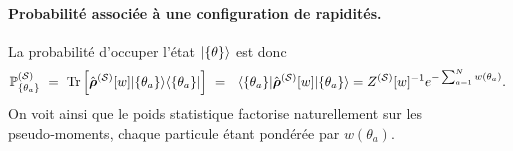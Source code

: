 \paragraph{Probabilité associée à une configuration de rapidités.}
La probabilité d’occuper l’état $\ket{\{\theta \}}$ est donc
\begin{eqnarray}
	\mathbb{P}^{(\mathcal{S})}_{\{ \theta_a \}} ~=~ \mathrm{Tr} \left [\operator{\rho}^{(\mathcal{S})}[w] \vert \{ \theta_a \} \rangle \langle \{ \theta_a \} \vert  \right ] ~= ~ \langle \{ \theta_a \}\vert \operator{\rho}^{(\mathcal{S})}[w] \vert  \{ \theta_a \} \rangle = Z^{(\mathcal{S})}[w]^{-1}e^{-\sum_{a = 1}^N w(\theta_a)}. 		
\end{eqnarray}
On voit ainsi que le poids statistique factorise naturellement sur les
pseudo‑moments, chaque particule étant pondérée par $w(\theta_a)$.



